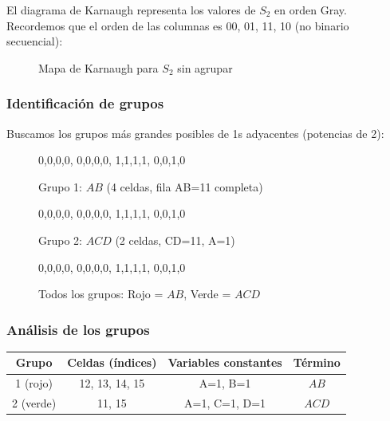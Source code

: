 \documentclass[11pt,a4paper]{article}
\begin{document}
El diagrama de Karnaugh representa los valores de $S_2$ en orden Gray. Recordemos que el orden de las columnas es 00, 01, 11, 10 (no binario secuencial):

\begin{figure}[H]
\centering
{}
\caption{Mapa de Karnaugh para $S_2$ sin agrupar}
\end{figure}

\subsubsection*{Identificación de grupos}

Buscamos los grupos más grandes posibles de 1s adyacentes (potencias de 2):

\begin{figure}[H]
\centering
{}%
  {0,0,0,0, 0,0,0,0, 1,1,1,1, 0,0,1,0}%
  {%
  }
\caption{Grupo 1: $AB$ (4 celdas, fila AB=11 completa)}
\end{figure}

\begin{figure}[H]
\centering
{}%
  {0,0,0,0, 0,0,0,0, 1,1,1,1, 0,0,1,0}%
  {%
  }
\caption{Grupo 2: $ACD$ (2 celdas, CD=11, A=1)}
\end{figure}

\begin{figure}[H]
\centering
{}%
  {0,0,0,0, 0,0,0,0, 1,1,1,1, 0,0,1,0}%
  {%
  }
\caption{Todos los grupos: Rojo = $AB$, Verde = $ACD$}
\end{figure}

\subsubsection*{Análisis de los grupos}

\begin{center}
\begin{tabular}{|c|c|c|c|}
\hline
\textbf{Grupo} & \textbf{Celdas (índices)} & \textbf{Variables constantes} & \textbf{Término} \\
\hline
1 (rojo) & 12, 13, 14, 15 & A=1, B=1 & $AB$ \\
\hline
2 (verde) & 11, 15 & A=1, C=1, D=1 & $ACD$ \\
\hline
\end{tabular}
\end{center}
\end{document}

